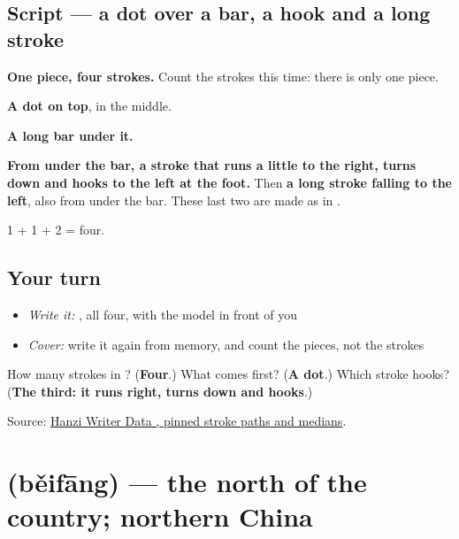 \subsection*{Script — a dot over a bar, a hook and a long stroke}

\begin{quote}
\end{quote}

\textbf{One piece, four strokes.} Count the strokes this time: there is only one piece.

\textbf{A dot on top}, in the middle.

\textbf{A long bar under it.}

\textbf{From under the bar, a stroke that runs a little to the right, turns down and hooks to the left at the foot.} Then \textbf{a long stroke falling to the left}, also from under the bar. These last two are made as in .

1 + 1 + 2 = four.

\subsection*{Your turn}
\begin{itemize}
\raggedright
  \item \emph{Write it:} , all four, with the model in front of you
  \item \emph{Cover:} write it again from memory, and count the pieces, not the strokes
\end{itemize}

\begin{tcolorbox}[breakable,colback=teal!4,colframe=teal!35!black,title={Before you move on}]
How many strokes in ? (\textbf{Four}.) What comes first? (\textbf{A dot}.) Which stroke hooks? (\textbf{The third: it runs right, turns down and hooks}.)

Source: \href{https://raw.githubusercontent.com/chanind/hanzi-writer-data/68d10a4b21150cae5e1ebbd223eed289cf32d90c/data/\%E6\%96\%B9.json}{Hanzi Writer Data , pinned stroke paths and medians}.
\end{tcolorbox}
\section[\texorpdfstring{\zh{北方} (běifāng)}{北方 (běifāng)}]{ (běifāng) — the north of the country; northern China}

